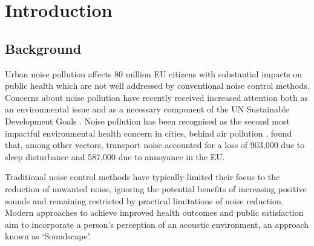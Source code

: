 \chapter{Introduction}
\label{ch:intro}




\section{Background}

Urban noise pollution affects 80 million EU citizens with substantial impacts on public health which are not well addressed by conventional noise control methods. Concerns about noise pollution have recently received increased attention both as an environmental issue \citep{Aletta2022Frontiers} and as a necessary component of the UN Sustainable Development Goals \citep{King2022Here}. Noise pollution has been recognised as the second most impactful environmental health concern in cities, behind air pollution \citep{CDC2011Burden}. \citet{CDC2011Burden} found that, among other vectors, transport noise accounted for a loss of 903,000  due to sleep disturbance and 587,000  due to annoyance in the EU.

Traditional noise control methods have typically limited their focus to the reduction of unwanted noise, ignoring the potential benefits of increasing positive sounds and remaining restricted by practical limitations of noise reduction. Modern approaches to achieve improved health outcomes and public satisfaction aim to incorporate a person's perception of an acoustic environment, an approach known as `Soundscape'.

